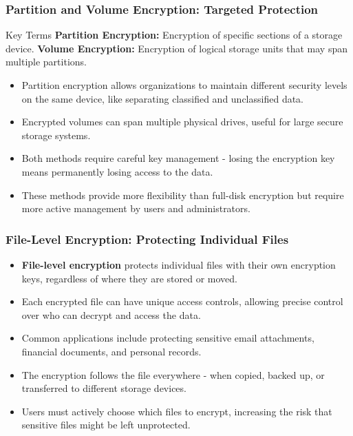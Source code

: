 \documentclass{beamer}
\begin{document}
\begin{frame}
    \frametitle{Partition and Volume Encryption: Targeted Protection}
    
    \begin{block}{Key Terms}
        \textbf{Partition Encryption:} Encryption of specific sections of a storage device.
        \textbf{Volume Encryption:} Encryption of logical storage units that may span multiple partitions.
    \end{block}
    
    \begin{itemize}
        \item Partition encryption allows organizations to maintain different security levels on the same device, like separating classified and unclassified data.
        
        \item Encrypted volumes can span multiple physical drives, useful for large secure storage systems.
        
        \item Both methods require careful key management - losing the encryption key means permanently losing access to the data.
        
        \item These methods provide more flexibility than full-disk encryption but require more active management by users and administrators.
    \end{itemize}
\end{frame}

\begin{frame}
    \frametitle{File-Level Encryption: Protecting Individual Files}
    
    \begin{itemize}
        \item \textbf{File-level encryption} protects individual files with their own encryption keys, regardless of where they are stored or moved.
        
        \item Each encrypted file can have unique access controls, allowing precise control over who can decrypt and access the data.
        
        \item Common applications include protecting sensitive email attachments, financial documents, and personal records.
        
        \item The encryption follows the file everywhere - when copied, backed up, or transferred to different storage devices.
        
        \item Users must actively choose which files to encrypt, increasing the risk that sensitive files might be left unprotected.
    \end{itemize}
\end{frame}
\end{document}
